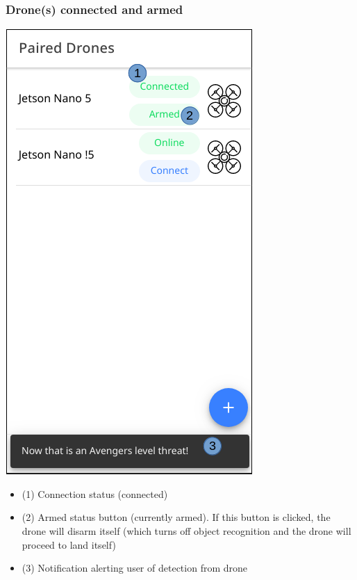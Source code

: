 \subsubsection{Drone(s) connected and armed}
\begin{minipage}[c]{0.5\linewidth}
	\centering
	\includegraphics[scale=0.4]{./assets/images/armed.png}
	\label{fig: mainPageArmed}
\end{minipage}
\begin{minipage}[c]{0.5\linewidth}
	\begin{itemize}
		\item (1) Connection status (connected)
		\item (2) Armed status button (currently armed). If this button is clicked, the drone will disarm itself (which turns off object recognition and the drone will proceed to land itself)
		\item (3) Notification alerting user of detection from drone
	\end{itemize}
\end{minipage}

